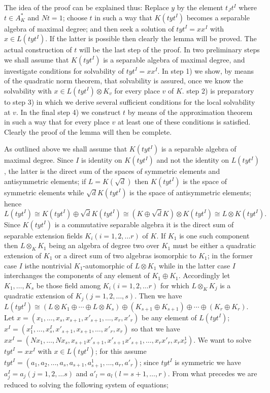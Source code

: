 \setcounter{proofoflem}{0}
\begin{proofoflem}\label{chap5:proofoflem1}%
  The idea of the proof can be explained thus: Replace $y$ by the
element $t_J t^{I}$ where $t \in A^*_K$ and $Nt=1$; choose $t$ in such
a way that $K(tyt^{I})$ becomes a separable algebra of maximal
degree;\pageoriginale 
and then seek a solution of $tyt^I=xx^{I}$ with $x \in L(tyt^I)$. If
the latter is possible then clearly the lemma will be proved. The
actual construction of $t$ will be the last step of the proof. In two
preliminary steps we shall assume that $K(tyt^I)$ is a separable
algebra of maximal degree, and investigate conditions for solvability
of $tyt^I=xx^I$. In step 1) we show, by means of the quadratic norm
theorem, that solvability is assured, once we know the solvability
with $x \in L(tyt^I) \otimes K_v$ for every place $v$ of $K$. step
2) is preparatory to step 3) in which we derive several
sufficient conditions for the local solvability at $v$. In the final
step 4) we construct $t$ by means of the approximation theorem in
such a way that for every place $v$ at least one of these conditions
is satisfied. Clearly the proof of the lemma will then be complete. 
\end{proofoflem}

As outlined above we shall assume that $K(tyt^I)$ is a
separable algebra of maximal degree. Since $I$ is identity on
$K(tyt^I)$ and  not the identity on $L(tyt^I)$, the latter is
the direct sum of the spaces of symmetric elements and
antisymmetric elements; if $L=K(\sqrt {d})$ then $K(tyt^I)$ is
the space of symmetric elements while $\sqrt{d}K(tyt^I)$ is
the space of antisymmetric elements; hence 
$$
L(tyt^I) \cong
K(tyt^I) \oplus \sqrt{d}K (tyt^I) \cong (K \oplus \sqrt{d}K)
\otimes K(tyt^I)\cong L \otimes K(tyt^I).
$$
Since $K(tyt^I)$ is
a commutative separable algebra it is the direct sum of
separable extension fields $K_i(i=1,2, \ldots r)$ of $K$. If
$K_1$ is one such component then $L \otimes_K K_1$ being an
algebra of degree two over $K_1$ must be either a quadratic
extension of $K_1$ or a direct sum of two algebras isomorphic
to $K_1$; in the former case  
$I$ is\pageoriginale the nontrivial $K_1$-automorphic of $L \otimes
K_1$ while in the latter case $I$ interchanges the components of any
element of $K_1 \oplus K_1$. Accordingly let $K_1, \ldots,K_s$ be those
field among $K_i(i=1,2,\ldots r)$ for which $L \otimes_K K_j$ is a
quadratic extension of $K_j(j=1,2,\ldots,s)$. Then we have $L(tyt^I)\cong (L
\otimes K_1 \oplus  \cdots \oplus L \otimes K_s)\oplus (K_{s+1}\oplus
K_{s+1}) \oplus \cdots \oplus (K_r \oplus K_r)$. Let  $x=(x_1,
\ldots,x_s,x_{s+1},x'_{s+1}, \ldots ,x_r,x'_r)$ be any element of
$L(tyt^I)$; $x^I=(x^I_1, \ldots ,x^I_s, x'_{s+1},x_{s+1}, \ldots
,x'_r,x_r)$ so that we have 
$xx^I=(Nx_1, \ldots, Nx_s,x_{s+1} x'_{s+1}, x'_{s+1}x'_{s+1}, \ldots ,x_r
x'_r, x_rx^1_r)$. We want to solve $tyt^I=xx^I$ with $x \in L(tyt^I)$;
for this assume 
$tyt^I = (a_1,a_2, \ldots, a_s,a_{s+1}, a^1_{s+1}, \ldots , a_r,a'_r)$;
since $tyt^I$ is symmetric we have $a^I_j=a_j(j=1,2,\ldots s)$ and
$a'_l=a_l (l=s+1, \ldots ,r)$. From what precedes we are reduced to solving
the following system of equations;  

